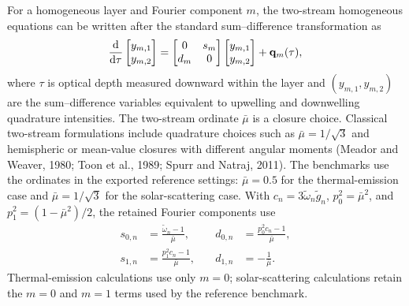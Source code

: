 \documentclass[gmd, manuscript]{copernicus}
\begin{document}
For a homogeneous layer and Fourier component $m$, the two-stream homogeneous
equations can be written after the standard sum--difference transformation as
\begin{equation}
  \frac{{\rm d}}{{\rm d}\tau}
  \begin{bmatrix}
    y_{m,1}\\
    y_{m,2}
  \end{bmatrix}
  =
  \begin{bmatrix}
    0 & s_m\\
    d_m & 0
  \end{bmatrix}
  \begin{bmatrix}
    y_{m,1}\\
    y_{m,2}
  \end{bmatrix}
  +
  \mathbf{q}_m(\tau),
  \label{eq:twostream_system}
\end{equation}
where $\tau$ is optical depth measured downward within the layer and
$(y_{m,1},y_{m,2})$ are the sum--difference variables equivalent to upwelling and
downwelling quadrature intensities.  The two-stream ordinate $\bar{\mu}$ is a closure
choice.  Classical two-stream formulations include quadrature choices such as
$\bar{\mu}=1/\sqrt{3}$ and hemispheric or mean-value closures with different angular
moments (Meador and Weaver, 1980; Toon et al., 1989; Spurr and Natraj, 2011).  The
benchmarks use the ordinates in the exported reference settings:
$\bar{\mu}=0.5$ for the thermal-emission case and $\bar{\mu}=1/\sqrt{3}$ for the
solar-scattering case.  With
$c_n=3\widetilde{\omega}_n\widetilde{g}_n$,
$p_0^2=\bar{\mu}^2$, and $p_1^2=(1-\bar{\mu}^2)/2$, the retained Fourier components
use
\begin{equation}
\begin{alignedat}{2}
s_{0,n} &= \frac{\widetilde{\omega}_n-1}{\bar{\mu}},
&\quad d_{0,n} &= \frac{p_0^2c_n-1}{\bar{\mu}},\\
s_{1,n} &= \frac{p_1^2c_n-1}{\bar{\mu}},
&\quad d_{1,n} &= -\frac{1}{\bar{\mu}} .
\end{alignedat}
\label{eq:twostream_sd}
\end{equation}
Thermal-emission calculations use only $m=0$; solar-scattering calculations retain the
$m=0$ and $m=1$ terms used by the reference benchmark.
\end{document}
